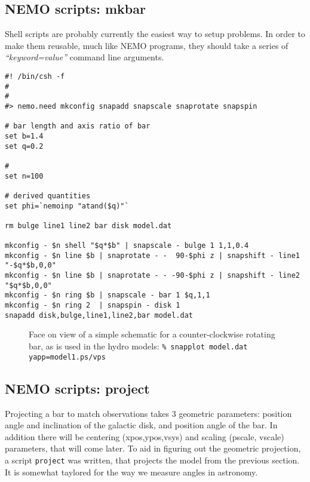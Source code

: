\documentclass[11pt]{article}
\begin{document}
\subsection{NEMO scripts: mkbar}

Shell scripts are probably currently the easiest way to setup
problems. In order to make them reusable, much like NEMO
programs, they should take a series of {\it ``keyword=value''}
command line arguments.

\footnotesize\begin{verbatim}
#! /bin/csh -f
#
#
#> nemo.need mkconfig snapadd snapscale snaprotate snapspin

# bar length and axis ratio of bar
set b=1.4
set q=0.2

# 
set n=100

# derived quantities
set phi=`nemoinp "atand($q)"`

rm bulge line1 line2 bar disk model.dat

mkconfig - $n shell "$q*$b" | snapscale - bulge 1 1,1,0.4
mkconfig - $n line $b | snaprotate - -  90-$phi z | snapshift - line1 "-$q*$b,0,0"
mkconfig - $n line $b | snaprotate - - -90-$phi z | snapshift - line2 "$q*$b,0,0"
mkconfig - $n ring $b | snapscale - bar 1 $q,1,1
mkconfig - $n ring 2  | snapspin - disk 1
snapadd disk,bulge,line1,line2,bar model.dat 

\end{verbatim}\normalsize

\begin{figure}[htbp]
\epsfysize=5cm
\caption{Face on view of a simple schematic for a counter-clockwise
rotating bar, as is used in the hydro models:\newline
 \tt \% snapplot model.dat yapp=model1.ps/vps
}
\end{figure}

\subsection{NEMO scripts: project}
 
Projecting a bar to match observations takes 3 geometric parameters:
position angle and inclination of the galactic disk, and position
angle of the bar. In addition there will be centering (xpos,ypos,vsys)
and scaling (pscale, vscale) parameters, that will come later. To
aid in figuring out the geometric projection, a script {\tt project}
was written, that projects the model from the previous section. It
is somewhat taylored for the way we measure angles in astronomy.
\end{document}
